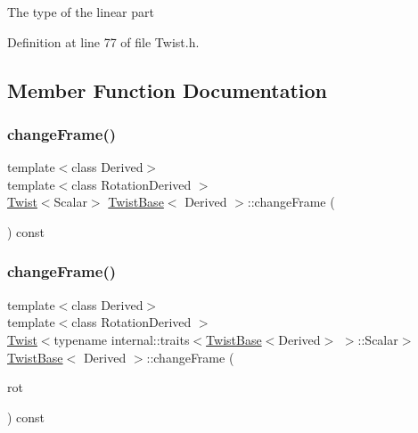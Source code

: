 The type of the linear part 

Definition at line 77 of file Twist.\+h.



\subsection{Member Function Documentation}
\hypertarget{class_twist_base_a6c88583539f3cd30d68576ea4d707525}{}\label{class_twist_base_a6c88583539f3cd30d68576ea4d707525} 
\subsubsection{\texorpdfstring{change\+Frame()}{changeFrame()}\hspace{0.1cm}{\footnotesize\ttfamily [1/2]}}
{\footnotesize\ttfamily template$<$class Derived$>$ \\
template$<$class Rotation\+Derived $>$ \\
\hyperlink{class_twist}{Twist}$<$Scalar$>$ \hyperlink{class_twist_base}{Twist\+Base}$<$ Derived $>$\+::change\+Frame (\begin{DoxyParamCaption}\item[{const \hyperlink{class_lie_group_base}{Lie\+Group\+Base}$<$ Quaternion$<$ Scalar $>$, Rotation\+Derived $>$ \&}]{ }\end{DoxyParamCaption}) const\hspace{0.3cm}{\ttfamily [inline]}}

\hypertarget{class_twist_base_a6e0074ec6e0621dc603d6eca78b4d9f2}{}\label{class_twist_base_a6e0074ec6e0621dc603d6eca78b4d9f2} 
\subsubsection{\texorpdfstring{change\+Frame()}{changeFrame()}\hspace{0.1cm}{\footnotesize\ttfamily [2/2]}}
{\footnotesize\ttfamily template$<$class Derived$>$ \\
template$<$class Rotation\+Derived $>$ \\
\hyperlink{class_twist}{Twist}$<$typename internal\+::traits$<$\hyperlink{class_twist_base}{Twist\+Base}$<$Derived$>$ $>$\+::Scalar$>$ \hyperlink{class_twist_base}{Twist\+Base}$<$ Derived $>$\+::change\+Frame (\begin{DoxyParamCaption}\item[{const \hyperlink{class_lie_group_base}{Lie\+Group\+Base}$<$ Quaternion$<$ Scalar $>$, Rotation\+Derived $>$ \&}]{rot }\end{DoxyParamCaption}) const\hspace{0.3cm}{\ttfamily [inline]}}



